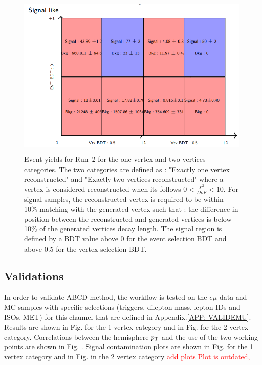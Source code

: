\documentclass{cernatlasnote}
\newcommand{\pt}{$p_{\text T}$\xspace}
\begin{document}
        \begin{figure}[ht]
\centering
\includegraphics[height=8cm, width=12cm, trim= 0cm 0cm 0cm 0cm,clip]{images/ABCD/EVTYieldsRun2.png}
\caption{\label{fig:EVTYIELDS} Event yields for Run~2 for the one vertex and two vertices categories. The two categories are defined as : "Exactly one vertex reconstructed" and "Exactly two vertices reconstructed" where a vertex is considered reconstructed when its follows $0<\frac{\chi^2}{DoF}<10$. For signal samples, the reconstructed vertex is required to be within 10\% matching with the generated vertex such that : the difference in position between the reconstructed and generated vertices is below 10\% of the generated vertices decay length. The signal region is defined by a BDT value above 0 for the event selection BDT and above 0.5 for the vertex selection BDT. }
\end{figure}  
\FloatBarrier
        \subsection{Validations}
        In order to validate ABCD method, the workflow is tested on the $e\mu$ data and MC samples with specific selections (triggers, dilepton mass, lepton IDs and ISOs, MET) for this channel that are defined in Appendix.\ref{APP: VALIDEMU}. Results are shown in Fig. for the 1 vertex category and in Fig. for the 2 vertex category.
        Correlations between the hemisphere \pt and the use of the two working points are shown in Fig. .
        Signal contamination plots are shown in Fig. for the 1 vertex category and in Fig. in the 2 vertex category \textcolor{red}{add plots}
        \textcolor{red}{Plot is outdated,}
   
    \newpage
\end{document}
